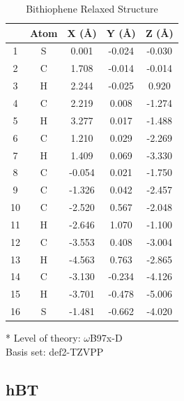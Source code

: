 \begin{table}[hbt!]\centering
\caption{Bithiophene Relaxed Structure}
\renewcommand{\arraystretch}{1.5}
\begin{threeparttable}
\begin{tabular}{ccccc}\toprule
{} & {Atom} & {X (\AA)} & {Y (\AA)} & {Z (\AA)} \\ \midrule
    1 & S & 0.001 & -0.024 & -0.030\\
    2 & C & 1.708 & -0.014 & -0.014\\
    3 & H & 2.244 & -0.025 & 0.920\\
    4 & C & 2.219 & 0.008 & -1.274\\
    5 & H & 3.277 & 0.017 & -1.488\\
    6 & C & 1.210 & 0.029 & -2.269\\
    7 & H & 1.409 & 0.069 & -3.330\\
    8 & C & -0.054 & 0.021 & -1.750\\
    9 & C & -1.326 & 0.042 & -2.457\\
    10 & C & -2.520 & 0.567 & -2.048\\
    11 & H & -2.646 & 1.070 & -1.100\\
    12 & C & -3.553 & 0.408 & -3.004\\
    13 & H & -4.563 & 0.763 & -2.865\\
    14 & C & -3.130 & -0.234 & -4.126\\
    15 & H & -3.701 & -0.478 & -5.006\\
    16 & S & -1.481 & -0.662 & -4.020\\ \bottomrule
\end{tabular}
\begin{tablenotes}
\item[*] \footnotesize Level of theory: $\omega$B97x-D \\ Basis set: def2-TZVPP
\end{tablenotes}
\end{threeparttable}
\end{table}

\clearpage
\subsection{hBT}

